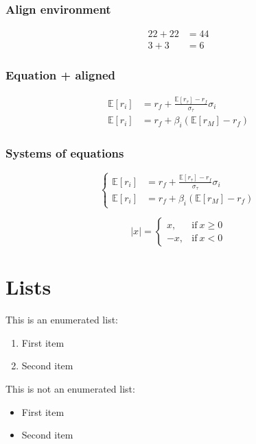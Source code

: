 \documentclass[a4paper, 12pt]{article}
\begin{document}
\subsubsection{Align environment}        
\begin{align}
    22+22&=44\\
    3+3&=6
\end{align}

\subsubsection{Equation + aligned}
\begin{equation} 
\label{eq:system}
\begin{aligned}
    \mathbb{E}[r_i]&=r_f+\frac{\mathbb{E}[r_\tau]-r_f}{\sigma_\tau}\sigma_i\\
    \mathbb{E}[r_i]&=r_f+\beta_i(\mathbb{E}[r_M]-r_f)
\end{aligned}
\end{equation}

\subsubsection{Systems of equations}
\[ 
\left\{
    \begin{aligned}
        \mathbb{E}[r_i]&=r_f+\frac{\mathbb{E}[r_\tau]-r_f}{\sigma_\tau}\sigma_i\\
        \mathbb{E}[r_i]&=r_f+\beta_i(\mathbb{E}[r_M]-r_f)
    \end{aligned}
\right.       
\]
        
\[
|x|=
\begin{cases}
    x, &\text{if}\ x \ge 0\\
    -x, &\text{if}\ x<0
\end{cases}
\]

\section{Lists}

\noindent This is an enumerated list:
\begin{enumerate}
    \item First item
    \item Second item
\end{enumerate}

\noindent This is not an enumerated list:
\begin{itemize}
    \item First item
    \item Second item
\end{itemize}
\end{document}
